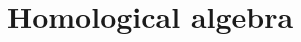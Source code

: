 \documentclass[../../main]{subfiles}
\begin{document}
\part{Homological algebra}\label{part:homological-algebra}

\ifSubfilesClassLoaded{%
    \tableofcontents
}{}

 






\end{document}
